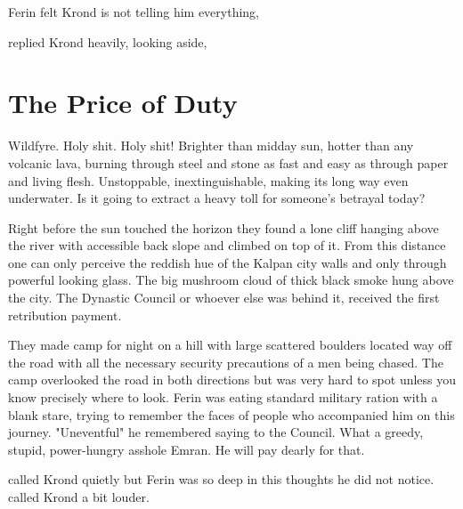  Ferin felt Krond is not telling him everything, 

 replied Krond heavily, looking aside, 

\section{The Price of Duty}

Wildfyre. Holy shit. Holy shit! Brighter than midday sun, hotter than any volcanic lava, burning through steel and stone as fast and easy as through paper and living flesh. Unstoppable, inextinguishable, making its long way even underwater. Is it going to extract a heavy toll for someone's betrayal today?

Right before the sun touched the horizon they found a lone cliff hanging above the river with accessible back slope and climbed on top of it. From this distance one can only perceive the reddish hue of the Kalpan city walls and only through powerful looking glass. The big mushroom cloud of thick black smoke hung above the city. The Dynastic Council or whoever else was behind it, received the first retribution payment.

They made camp for night on a hill with large scattered boulders located way off the road with all the necessary security precautions of a men being chased. The camp overlooked the road in both directions but was very hard to spot unless you know precisely where to look. Ferin was eating standard military ration with a blank stare, trying to remember the faces of people who accompanied him on this journey. "Uneventful" he remembered saying to the Council. What a greedy, stupid, power-hungry asshole Emran. He will pay dearly for that.

 called Krond quietly but Ferin was so deep in this thoughts he did not notice.  called Krond a bit louder.



